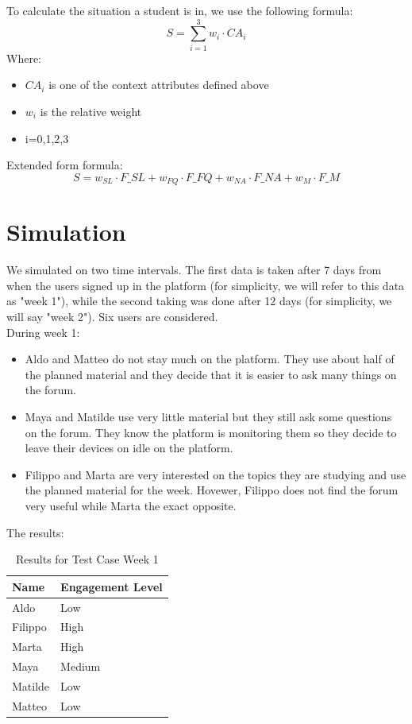To calculate the situation a student is in, we use the following formula:
\[ 
S = \sum_{i=1}^3  w_i \cdot CA_i  
\]
Where:
\begin{itemize}
    \item $CA_i$ is one of the context attributes defined above
    \item $w_i$ is the relative weight
    \item i=0,1,2,3
\end{itemize}
Extended form formula:
\[
S = w_{SL} \cdot F\_SL + w_{FQ} \cdot F\_FQ + w_{NA} \cdot F\_NA + w_M \cdot F\_M
\]

\section{Simulation}
We simulated on two time intervals. The first data is taken after 7 days from when 
the users signed up in the platform (for simplicity, we will refer to this data as "week 1"), 
while the second taking was done after 12 days (for simplicity, we will say "week 2"). Six users 
are considered.\\
During week 1:
\begin{itemize}
    \item Aldo and Matteo do not stay much on the platform. They use about half of the planned 
    material and they decide that it is easier to ask many things on the forum.
    \item Maya and Matilde use very little material but they still ask some questions on the forum. 
    They know the platform is monitoring them so they decide to leave their devices on idle on the
     platform.
    \item Filippo and Marta are very interested on the topics they are studying and use the planned 
    material for the week. Hovewer, Filippo does not find the forum very useful while Marta the exact 
    opposite.
\end{itemize}

The results:\\
\vspace{1em}
\begin{table}[H]
\centering
\begin{tabular}{l l}
\toprule
Name     & Engagement Level \\
\midrule
Aldo     & Low \\
Filippo  & High \\
Marta    & High \\
Maya     & Medium \\
Matilde  & Low \\
Matteo   & Low \\
\bottomrule
\end{tabular}
\caption{Results for Test Case Week 1}
\end{table}
\vspace{1em}

